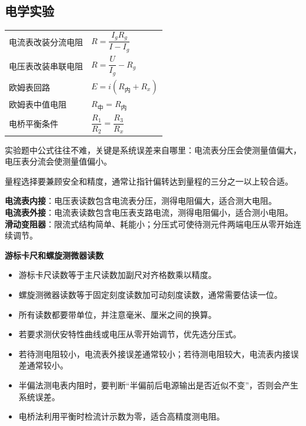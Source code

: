 
\subsection{电学实验}

\begin{tabularx}{\columnwidth}{XX}
  电流表改装分流电阻&$R=\dfrac{I_gR_g}{I-I_g}$\\
  电压表改装串联电阻&$R=\dfrac{U}{I_g}-R_g$\\
  欧姆表回路&$E=i(R_{\text{内}}+R_x)$\\
  欧姆表中值电阻&$R_{\text{中}}=R_{\text{内}}$\\
  电桥平衡条件&$\dfrac{R_1}{R_2}=\dfrac{R_3}{R_x}$\\
\end{tabularx}

\begin{formulanotebox}
实验题中公式往往不难，关键是系统误差来自哪里：电流表分压会使测量值偏大，电压表分流会使测量值偏小。

量程选择要兼顾安全和精度，通常让指针偏转达到量程的三分之一以上较合适。
\end{formulanotebox}

\begin{keypointbox}[title={\strut\textcolor{white}{\bfseries 重点知识点：伏安法测电阻}}]
\textbf{电流表内接}：电压表读数包含电流表分压，测得电阻偏大，适合测大电阻。\\

\textbf{电流表外接}：电流表读数包含电压表支路电流，测得电阻偏小，适合测小电阻。\\

\textbf{滑动变阻器}：限流式结构简单、耗能小；分压式可使待测元件两端电压从零开始连续调节。
\end{keypointbox}

\textbf{游标卡尺和螺旋测微器读数}

\begin{itemize}[leftmargin=1.5em]
  \item 游标卡尺读数等于主尺读数加副尺对齐格数乘以精度。
  \item 螺旋测微器读数等于固定刻度读数加可动刻度读数，通常需要估读一位。
  \item 所有读数都要带单位，并注意毫米、厘米之间的换算。
\end{itemize}

\begin{casetypebox}[title={\strut\textcolor{white}{\bfseries 常见题型：实验方案选择}}]
\begin{itemize}[leftmargin=1.5em]
  \item 若要求测伏安特性曲线或电压从零开始调节，优先选分压式。
  \item 若待测电阻较小，电流表外接误差通常较小；若待测电阻较大，电流表内接误差通常较小。
  \item 半偏法测电表内阻时，要判断“半偏前后电源输出是否近似不变”，否则会产生系统误差。
  \item 电桥法利用平衡时检流计示数为零，适合高精度测电阻。
\end{itemize}
\end{casetypebox}
